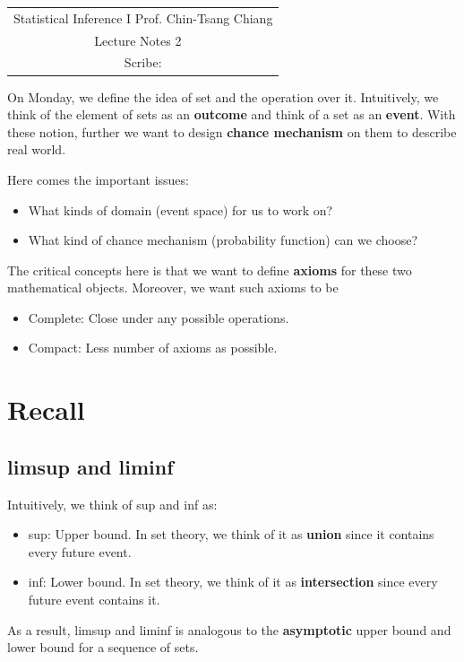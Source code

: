 \documentclass[Probability_Theory.tex]{subfiles}
\begin{document}
	\begin{center}
		\renewcommand{\arraystretch}{2}
		\begin{bfseries}
			\begin{tabular}{|c|}
				\hline
				Statistical Inference I \hfill Prof. Chin-Tsang Chiang\\
				\hspace{15em} {\large Lecture Notes 2} \hspace{15em}\ \\
				\lecdate \hfill Scribe: \scribe\\
				\hline
			\end{tabular}
			\renewcommand{\arraystretch}{1}
		\end{bfseries}
	\end{center}
On Monday, we define the idea of set and the operation over it. Intuitively, we think of the element of sets as an {\bf outcome} and think of a set as an {\bf event}. With these notion, further we want to design {\bf chance mechanism} on them to describe real world.

Here comes the important issues:
\begin{itemize}
	\item What kinds of domain (event space) for us to work on?
	\item What kind of chance mechanism (probability function) can we choose?
\end{itemize}
The critical concepts here is that we want to define {\bf axioms} for these two mathematical objects. Moreover, we want such axioms to be
\begin{itemize}
	\item Complete: Close under any possible operations.
	\item Compact: Less number of axioms as possible.
\end{itemize}

\section{Recall}
\subsection{limsup and liminf}
Intuitively, we think of sup and inf as:
\begin{itemize}
	\item sup: Upper bound. In set theory, we think of it as {\bf union} since it contains every future event.
	\item inf: Lower bound. In set theory, we think of it as {\bf intersection} since every future event contains it.
\end{itemize}
As a result, limsup and liminf is analogous to the {\bf asymptotic} upper bound and lower bound for a sequence of sets.
\end{document}
